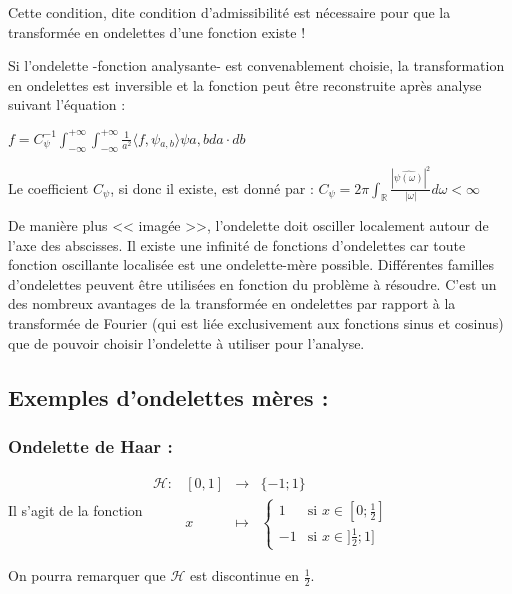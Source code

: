 \documentclass{article}
\begin{document}
Cette condition, dite condition d’admissibilité est nécessaire pour que la transformée en ondelettes d’une fonction existe !

Si l'ondelette -fonction analysante- est convenablement choisie, la transformation en ondelettes est inversible et la fonction peut être reconstruite après analyse suivant l'équation : \\
\begin{center}
$\displaystyle f = C_{\psi}^{-1}\int_{-\infty}^{+\infty}\int_{-\infty}^{+\infty}\frac{1}{a^2}\langle{}f,\psi{}_{a,b}\rangle\psi{a,b}da\cdot{}db$ \\
\end{center}

Le coefficient $C_{\psi}$, si donc il existe, est donné par : $\displaystyle C_{\psi} = 2\pi\int_{\mathbb{R}}\frac{|\hat{\psi{}(\omega)}|^2}{|\omega|}d\omega < \infty$


De manière plus << imagée >>, l’ondelette doit osciller localement autour de l’axe des abscisses.
Il existe une infinité de fonctions d’ondelettes car toute fonction oscillante localisée est une ondelette-mère possible.
Différentes familles d’ondelettes peuvent être utilisées en fonction du problème à résoudre. C’est un des nombreux avantages de la transformée en ondelettes par rapport à la transformée de Fourier (qui est liée exclusivement aux fonctions sinus et cosinus) que de pouvoir choisir l’ondelette à utiliser pour l’analyse.


\subsection{Exemples d’ondelettes mères :}

\subsubsection{Ondelette de Haar :}

Il s'agit de la fonction $\begin{array}{lrcl}
\mathcal{H} : & [0,1] & \longrightarrow & \{-1;1\} \\
    & x & \longmapsto & \begin{cases}
   1 & \text{si } x \in [0;\frac{1}{2}] \\
   -1       & \text{si } x \in ]\frac{1}{2};1]
  \end{cases} \end{array}$
  
On pourra remarquer que $\mathcal{H}$ est discontinue en $\frac{1}{2}$.
\end{document}
